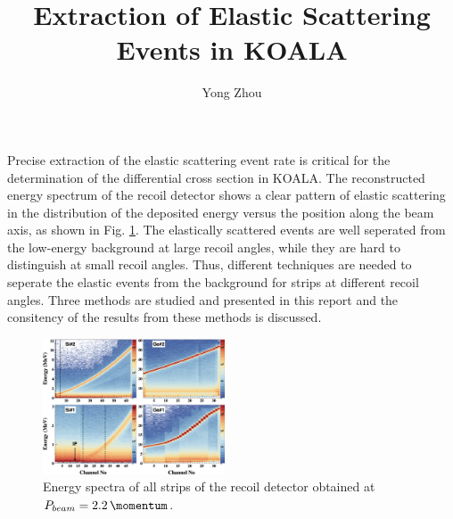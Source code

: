 \documentclass[fleqn,twocolumn,a4paper]{ikpar}
\begin{document}
\parindent=0pt
\frenchspacing

\title{{\bf
    Extraction of Elastic Scattering Events in KOALA
}}
\author{Yong Zhou
}

\maketitle

Precise extraction of the elastic scattering event rate is critical for the
determination of the differential cross section in KOALA.
The reconstructed energy spectrum of the recoil detector shows a clear pattern of
elastic scattering in the distribution of the deposited energy versus the position along the beam axis, as shown in Fig. \ref{fig:energy_vs_strips}.
The elastically scattered events are well seperated from the low-energy background at large
recoil angles, while they are hard to distinguish at small recoil angles.
Thus, different techniques are needed to seperate the elastic events from the
background for strips at different recoil angles.
Three methods are studied and presented in this report and the consitency of the results from these methods is discussed.
\begin{figure}[!htb]
	\includegraphics[width=0.48\textwidth]{./energy_vs_strips.png}
  \caption{Energy spectra of all strips of the recoil detector obtained at
    $P_{beam} = \SI{2.2}{\momentum}$.}
  \label{fig:energy_vs_strips}
\end{figure}

\par
\medskip
\end{document}
